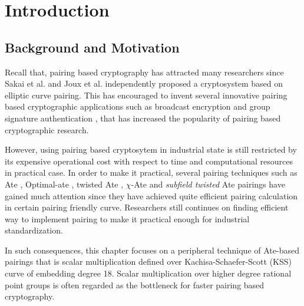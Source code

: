 


\section{Introduction}
\subsection{Background and Motivation}
Recall that, pairing based cryptography has attracted many researchers since Sakai et al. \cite{EPRINT:SakKas03} and Joux et al. \cite{JC:Joux04} independently proposed a cryptosystem based on elliptic curve pairing. This has encouraged to invent several innovative pairing based cryptographic applications such as broadcast encryption \cite{C:BonGenWat05} and group signature authentication \cite{C:BonBoySha04}, that has increased the popularity of pairing based cryptographic research.

However, using pairing based cryptosytem in industrial state is still restricted by its expensive operational cost with respect to time and computational resources in practical case. 
In order to make it practical, several pairing techniques such as Ate \cite{DBLP:reference/crc/2005ehcc}, Optimal-ate \cite{DBLP:journals/tit/Vercauteren10}, twisted Ate \cite{EPRINT:MKHO07}, $\chi$-Ate \cite{PAIRING:NASKM08} and \textit{subfield twisted} Ate \cite{PAIRING:DevScoDah07} pairings have gained much attention since they have achieved quite efficient pairing calculation in certain pairing friendly curve. 
Researchers still continues on finding efficient way to implement pairing to make it practical enough for industrial standardization. 

In such consequences, this chapter focuses on a peripheral technique of Ate-based pairings  that is scalar multiplication defined over Kachisa-Schaefer-Scott (KSS) curve \cite{EPRINT:KacSchSco07} of embedding degree 18. 
Scalar multiplication over higher degree rational point groups is often regarded as the bottleneck for faster pairing based cryptography.

